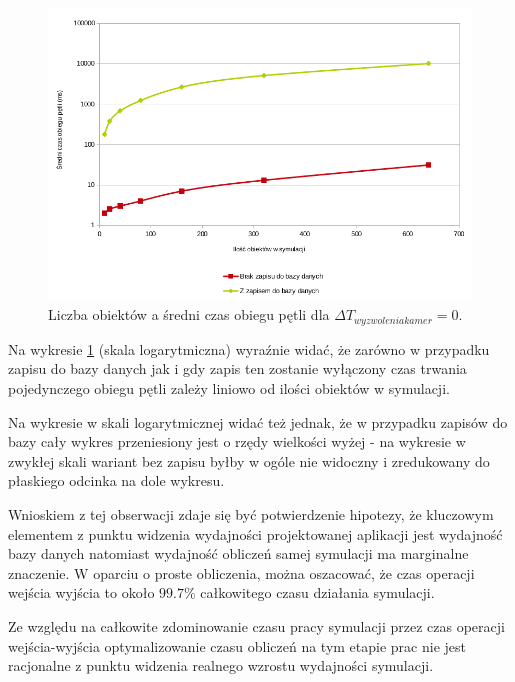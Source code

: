 \begin{figure}[!ht]
    \begin{center}
	\includegraphics[width=\textwidth,keepaspectratio]{img/wykres_2}
	\caption{Liczba obiektów a średni czas obiegu pętli dla $\Delta T_{wyzwolenia kamer} = 0$.}
	\label{ex_2_chart}
    \end{center}
\end{figure}


\par{
Na wykresie \ref{ex_2_chart} (skala logarytmiczna) wyraźnie widać, że zarówno w przypadku zapisu do bazy danych jak i gdy zapis ten zostanie wyłączony czas trwania pojedynczego obiegu pętli zależy liniowo od ilości obiektów w symulacji.
}
\par{
Na wykresie w skali logarytmicznej widać też jednak, że w przypadku zapisów do bazy cały wykres przeniesiony jest o rzędy wielkości wyżej - na wykresie w zwykłej skali wariant bez zapisu byłby w ogóle nie widoczny i zredukowany do płaskiego odcinka na dole wykresu.
}
\par{
Wnioskiem z tej obserwacji zdaje się być potwierdzenie hipotezy, że kluczowym elementem z punktu widzenia wydajności projektowanej aplikacji jest wydajność bazy danych natomiast wydajność obliczeń samej symulacji ma marginalne znaczenie. W oparciu o proste obliczenia, można oszacować, że czas operacji wejścia wyjścia to około $99.7\%$ całkowitego czasu działania symulacji.
}
\par{
Ze względu na całkowite zdominowanie czasu pracy symulacji przez czas operacji wejścia-wyjścia optymalizowanie czasu obliczeń na tym etapie prac nie jest racjonalne z punktu widzenia realnego wzrostu wydajności symulacji.
}

